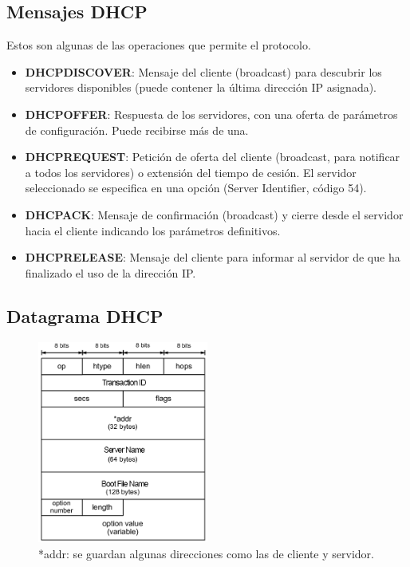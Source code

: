 \subsection{Mensajes DHCP}
Estos son algunas de las operaciones que permite el protocolo.
\begin{itemize}
    \item \textbf{DHCPDISCOVER}: Mensaje del cliente (broadcast) para descubrir los servidores disponibles (puede contener la última dirección IP asignada).
    \item \textbf{DHCPOFFER}: Respuesta de los servidores, con una oferta de parámetros de configuración. Puede
    recibirse más de una.
    \item \textbf{DHCPREQUEST}: Petición de oferta del cliente (broadcast, para notificar a todos los servidores) o extensión del tiempo de cesión. El servidor seleccionado se especifica en una opción (Server Identifier, código 54).
    \item \textbf{DHCPACK}: Mensaje de confirmación (broadcast) y cierre desde el servidor hacia el cliente indicando los parámetros definitivos.
    \item \textbf{DHCPRELEASE}: Mensaje del cliente para informar al servidor de que ha finalizado el uso de la dirección IP.
\end{itemize}
\subsection{Datagrama DHCP}
\begin{figure}[H]
    \centering
    \includegraphics[width=0.5\textwidth]{img/DHCPformat.jpg}
    \caption{*addr: se guardan algunas direcciones como las de cliente y servidor.}
\end{figure}
\newpage
